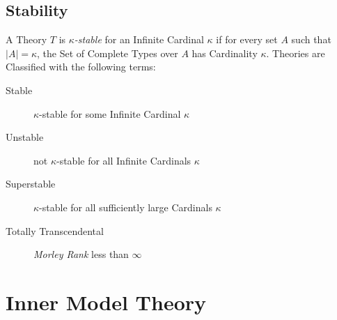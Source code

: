 \subsection{Stability}\label{sec:model_stability}

A Theory $T$ is \emph{$\kappa$-stable} for an Infinite Cardinal $\kappa$
if for every set $A$ such that $|A| = \kappa$, the Set of Complete
Types over $A$ has Cardinality $\kappa$. Theories are Classified with
the following terms:
\begin{description}
\item [Stable] $\kappa$-stable for some Infinite Cardinal $\kappa$
\item [Unstable] not $\kappa$-stable for all Infinite Cardinals $\kappa$
\item [Superstable] $\kappa$-stable for all sufficiently large
  Cardinals $\kappa$
\item [Totally Transcendental] \emph{Morley Rank}\cite{morley65} less
  than $\infty$
\end{description}



\section{Inner Model Theory}\label{sec:inner_model_theory}
